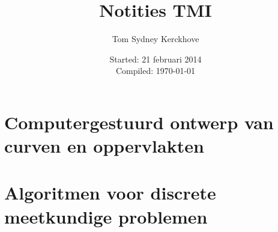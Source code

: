 \documentclass[10pt,a4paper,oneside]{book}
\author{Tom Sydney Kerckhove}
\title{Notities TMI}
\date{Started: 21 februari 2014\\ Compiled: \today}
\begin{document}

\tableofcontents


\part{Computergestuurd ontwerp van curven en oppervlakten}






\part{Algoritmen voor discrete meetkundige problemen}


\iffalse
\chapter{Inleiding}
\chapter{Algoritmen voor eenvoudige meetkundige problemen}
\chapter{Berekenen van de convex omhullende}
\chapter{Het dichtste puntenpaar en het verste puntenpaar}
\chapter{Het Voronoi-diagram van een puntenverzameling}
\chapter{Nabijheidsproblemen}
\chapter{Berekenen van het Voronoi-diagram}
\fi

\listoftodos
\end{document}
